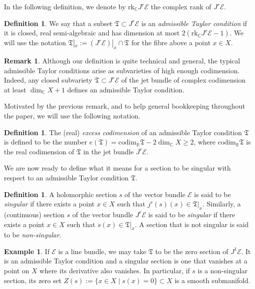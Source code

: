 \documentclass[a4paper]{amsart}
\newcommand{\bR}{\mathbb R}
\newcommand{\bC}{\mathbb C}
\newcommand{\cE}{\mathcal E}
\newcommand{\fT}{\mathfrak T}
\theoremstyle{plain}
\theoremstyle{definition}
\newtheorem{definition}[theorem]{Definition}
\newtheorem{example}[theorem]{Example}
\newtheorem{remark}[theorem]{Remark}
\newcommand{\rank}{\mathrm{rk}}
\begin{document}
In the following definition, we denote by $\rank_\bC J^r\cE$ the complex rank of $J^r\cE$.

\begin{definition}\label{def:admissibletaylor}
We say that a subset $\fT \subset J^r\cE$ is an \emph{admissible Taylor condition} if it is closed, real semi-algebraic and has dimension at most $2(\rank_\bC J^r\cE - 1)$. We will use the notation $\fT|_x := (J^r\cE)|_x \cap \fT$ for the fibre above a point $x \in X$.
\end{definition}

\begin{remark}
Although our definition is quite technical and general, the typical admissible Taylor conditions arise as subvarieties of high enough codimension. Indeed, any closed subvariety $\fT \subset J^r\cE$ of the jet bundle of complex codimension at least $\dim_\bC X + 1$ defines an admissible Taylor condition.
\end{remark}

Motivated by the previous remark, and to help general bookkeeping throughout the paper, we will use the following notation.
\begin{definition}\label{def:excesscodimension}
The (real) \emph{excess codimension} of an admissible Taylor condition $\fT$ is defined to be the number $e(\fT) = \mathrm{codim}_\bR \fT - 2\dim_\bC X \geq 2$, where $\mathrm{codim}_\bR \fT$ is the real codimension of $\fT$ in the jet bundle $J^r\cE$.
\end{definition}

We are now ready to define what it means for a section to be singular with respect to an admissible Taylor condition $\fT$.

\begin{definition}\label{def:singular}
A holomorphic section $s$ of the vector bundle $\cE$ is said to be \emph{singular} if there exists a point $x \in X$ such that $j^r(s)(x) \in \fT|_x$.
Similarly, a (continuous) section $s$ of the vector bundle $J^r\cE$ is said to be \emph{singular} if there exists a point $x \in X$ such that $s(x) \in \fT|_x$. A section that is not singular is said to be \emph{non-singular}.
\end{definition}

\begin{example}
If $\cE$ is a line bundle, we may take $\fT$ to be the zero section of $J^1\cE$. It is an admissible Taylor condition and a singular section is one that vanishes at a point on $X$ where its derivative also vanishes. In particular, if $s$ is a non-singular section, its zero set $Z(s) := \{x \in X \mid s(x)=0 \} \subset X$ is a smooth submanifold.
\end{example}
\end{document}

